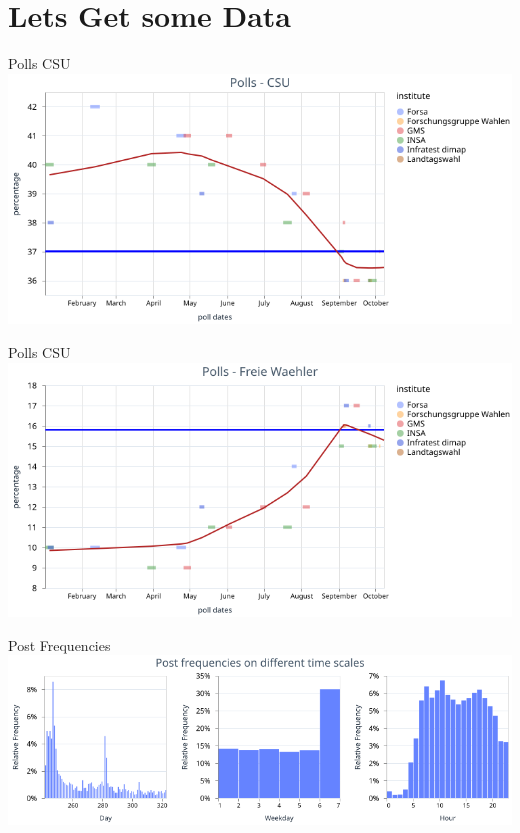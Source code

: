 \documentclass[usenames,dvipsnames,aspectratio=169]{beamer}
\begin{document}
	\section{Lets Get some Data}
	\begin{frame}{Polls CSU}
		\includegraphics[width=\linewidth, keepaspectratio]{pictures/paper/polls/visualization_csu_polls.png}
	\end{frame}
	
	\begin{frame}{Polls CSU}
		\includegraphics[width=\linewidth, keepaspectratio]{pictures/paper/polls/visualization_fw_polls.png}
	\end{frame}
	
	\begin{frame}{Post Frequencies}
		\includegraphics[width=\linewidth, keepaspectratio]{pictures/paper/sentiments/visualization_valid_posts_frequency.png}
	\end{frame}
	
	
\end{document}
